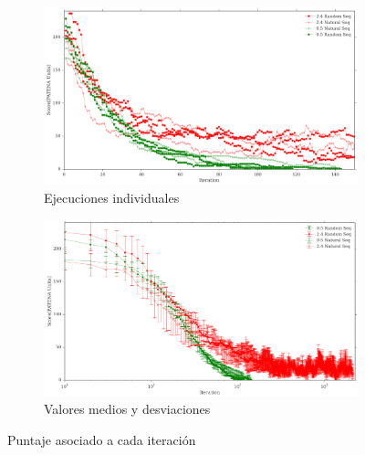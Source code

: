 % 
% 


\begin{figure}[htbp]
\advance\leftskip-1.5cm
  \begin{subfigure}[b]{\textwidth}
    \includegraphics[width=1.15\textwidth]{img/resultados/individuales-scoreVsiter-hasta150.png}
    \caption{Ejecuciones individuales}
    \label{fig:scoreVsiter-a}
  \end{subfigure}
  \begin{subfigure}[b]{\textwidth}
    \includegraphics[width=1.15\textwidth]{img/resultados/scoreVsiter-cada1-hasta2270.png}
    \caption{Valores medios y desviaciones}
  \label{fig:scoreVsiter-b}
  \end{subfigure}
  \caption{Puntaje asociado a cada iteración}
  \label{fig:scoreVsiter}
\end{figure}

